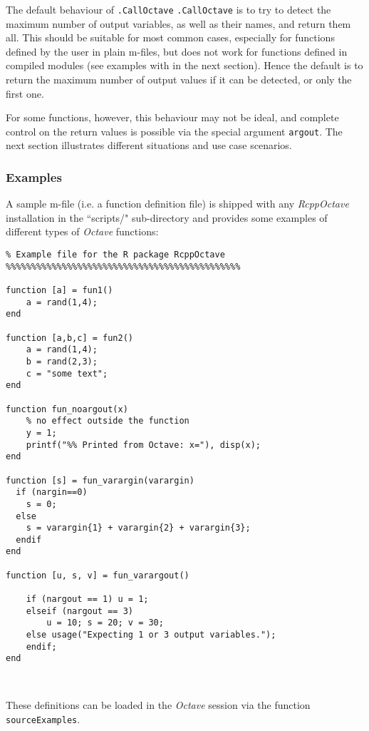 \documentclass[english,10pt,a4paper]{article}\usepackage{graphicx, color}
\let\proglang=\textit
\let\code=\texttt
\newcommand{\pkgname}[1]{\textit{#1}\xspace}
\newcommand{\octave}{\proglang{Octave}\xspace}
\begin{document}
The default behaviour of \code{.CallOctave} \code{.CallOctave} is to try to
detect the maximum number of output variables, as well as their names, and
return them all.
This should be suitable for most common cases, especially for functions
defined by the user in plain m-files, but does not work for functions defined in
compiled modules (see examples with in the next section).
Hence the default is to return the maximum number of output values if it can be
detected, or only the first one.

For some functions, however, this behaviour may not be ideal, and complete
control on the return values is possible via the special argument \code{argout}.
The next section illustrates different situations and use case scenarios.

\subsubsection{Examples}

A sample m-file (i.e. a function definition file) is shipped with any 
\pkgname{RcppOctave} installation in the ``scripts/" sub-directory and provides
some examples of different types of \octave functions:

\begin{Verbatim}[frame=single]
%%%%%%%%%%%%%%%%%%%%%%%%%%%%%%%%%%%%%%%%%%%%%%
% Example file for the R package RcppOctave
%%%%%%%%%%%%%%%%%%%%%%%%%%%%%%%%%%%%%%%%%%%%%%

function [a] = fun1()
	a = rand(1,4);
end

function [a,b,c] = fun2()
	a = rand(1,4);
	b = rand(2,3);
	c = "some text";
end

function fun_noargout(x) 
	% no effect outside the function
	y = 1;
	printf("%% Printed from Octave: x="), disp(x);
end

function [s] = fun_varargin(varargin)
  if (nargin==0)
	s = 0;
  else
	s = varargin{1} + varargin{2} + varargin{3};
  endif
end

function [u, s, v] = fun_varargout()

	if (nargout == 1) u = 1; 
	elseif (nargout == 3)
		u = 10; s = 20; v = 30; 
	else usage("Expecting 1 or 3 output variables.");
	endif; 
end



\end{Verbatim}

These definitions can be loaded in the \octave session via the function
\code{sourceExamples}.
\end{document}
